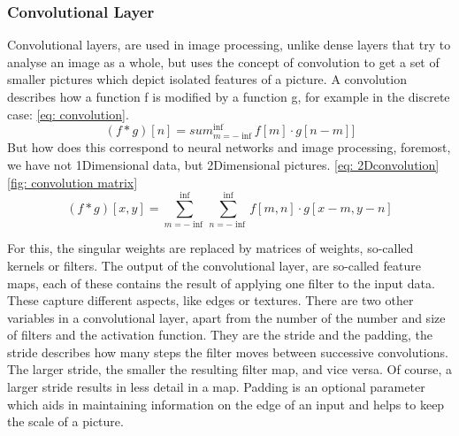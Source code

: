 \subsubsection{Convolutional Layer}
Convolutional layers, are used in image processing\cite{lecun_backpropagation_1989,szegedy_going_2014,krizhevsky_imagenet_2012}, unlike dense layers that try to analyse an image as a whole, but uses the concept of convolution to get a set of smaller pictures which depict isolated features of a picture.
A convolution describes how a function f is modified by a function g, for example in the discrete case: \ref{eq: convolution}.
\begin{equation}
(f \ast g)[n] = sum_{m=-\inf}^{\inf}f[m]\cdot g[n - m]
    \label{eq: convolution}]
\end{equation}
But how does this correspond to neural networks and image processing, foremost, we have not 1Dimensional data, but 2Dimensional pictures. \ref{eq: 2Dconvolution} \ref{fig: convolution matrix}
\begin{equation}
(f \ast g)[x,y] = \sum^{\inf}_{m=-\inf} \sum^{\inf}_{n=-\inf} f[m,n]\cdot g[x-m,y-n]
    \label{eq: 2Dconvolution}
\end{equation}

For this, the singular weights are replaced by matrices of weights, so-called kernels or filters.
The output of the convolutional layer, are so-called feature maps, each of these contains the result of applying one filter to the input data.
These capture different aspects, like edges or textures.
There are two other variables in a convolutional layer, apart from the number of the number and size of filters and the activation function.
They are the stride and the padding, the stride describes how many steps the filter moves between successive convolutions.
The larger stride, the smaller the resulting filter map, and vice versa.
Of course, a larger stride results in less detail in a map.
Padding is an optional parameter which aids in maintaining information on the edge of an input and helps to keep the scale of a picture.
